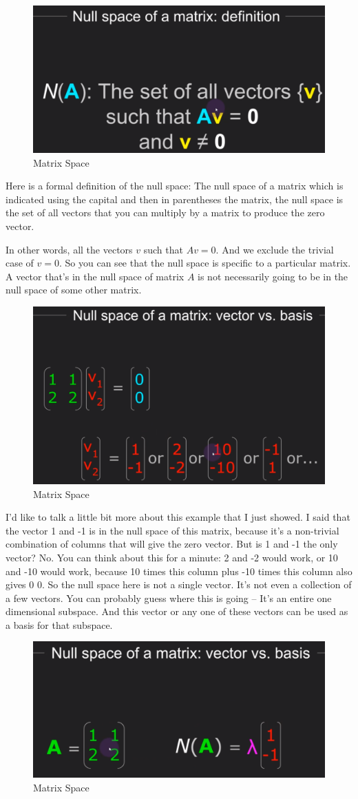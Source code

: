 \documentclass[fleqn,10pt]{olplainarticle}
\theoremstyle{definition}
\theoremstyle{remark}
\begin{document}
\begin{figure}[ht]
	\centering
	\includegraphics[width=0.3\linewidth]{images/matrix-space-19.png}
	\caption{Matrix Space}
	\label{fig:matrix_space_19}
\end{figure}

Here is a formal definition of the null space: The null space of a matrix which is indicated using the capital and then in parentheses the matrix, the null space is the set of all vectors that you can multiply by a matrix to produce the zero vector.

In other words, all the vectors $v$ such that $Av=0$. And we exclude the trivial case of $v=0$. So you can see that the null space is specific to a particular matrix. A vector that's in the null space of matrix $A$ is not necessarily going to be in the null space of some other matrix.

\begin{figure}[ht]
	\centering
	\includegraphics[width=0.4\linewidth]{images/matrix-space-20.png}
	\caption{Matrix Space}
	\label{fig:matrix_space_20}
\end{figure}

I'd like to talk a little bit more about this example that I just showed. I said that the vector 1 and -1 is in the null space of this matrix, because it's a non-trivial combination of columns that will give the zero vector. But is 1 and -1 the only vector? No. You can think about this for a minute: 2 and -2 would work, or 10 and -10 would work, because 10 times this column plus -10 times this column also gives 0 0. So the null space here is not a single vector. It's not even a collection of a few vectors. You can probably guess where this is going -- It's an entire one dimensional subspace. And this vector or any one of these vectors can be used as a basis for that subspace.

\begin{figure}[ht]
	\centering
	\includegraphics[width=0.4\linewidth]{images/matrix-space-21.png}
	\caption{Matrix Space}
	\label{fig:matrix_space_21}
\end{figure}
\end{document}
